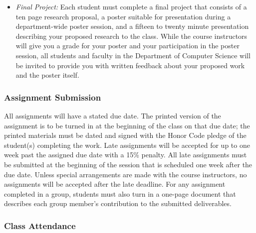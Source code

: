 \begin{itemize}
\item {\em Final Project:} Each student must complete a final project that consists of a ten page research proposal, a
  poster suitable for presentation during a department-wide poster session, and a fifteen to twenty minute presentation
  describing your proposed research to the class. While the course instructors will give you a grade for your poster and
  your participation in the poster session, all students and faculty in the Department of Computer Science will be
  invited to provide you with written feedback about your proposed work and the poster itself.  
  
\end{itemize}

\vspace{-.25in}
\subsubsection*{Assignment Submission}

All assignments will have a stated due date. The printed version of the assignment is to be turned in at the beginning
of the class on that due date; the printed materials must be dated and signed with the Honor Code pledge of the
student(s) completing the work.  Late assignments will be accepted for up to one week past the assigned due date with a
15\% penalty. All late assignments must be submitted at the beginning of the session that is scheduled one week after
the due date. Unless special arrangements are made with the course instructors, no assignments will be accepted after the
late deadline. For any assignment completed in a group, students must also turn in a one-page document that describes
each group member's contribution to the submitted deliverables.  


\vspace{-.20in}
\subsubsection*{Class Attendance}

